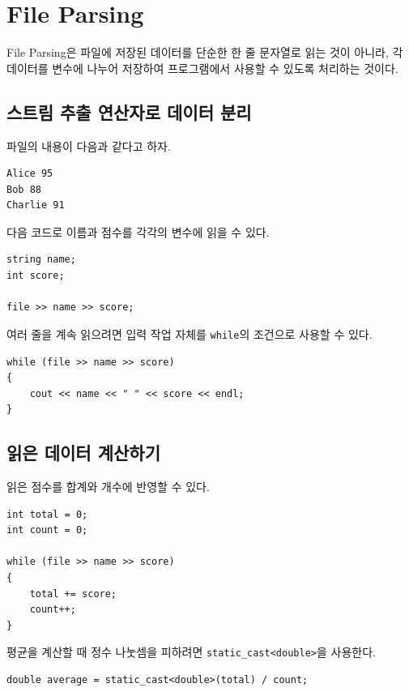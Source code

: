 \documentclass[11pt,a4paper]{article}
\begin{document}
\section{File Parsing}
File Parsing은 파일에 저장된 데이터를 단순한 한 줄 문자열로 읽는 것이 아니라,
각 데이터를 변수에 나누어 저장하여 프로그램에서 사용할 수 있도록 처리하는 것이다.

\subsection{스트림 추출 연산자로 데이터 분리}
파일의 내용이 다음과 같다고 하자.

\begin{verbatim}
Alice 95
Bob 88
Charlie 91
\end{verbatim}

다음 코드로 이름과 점수를 각각의 변수에 읽을 수 있다.

\begin{lstlisting}
string name;
int score;

file >> name >> score;
\end{lstlisting}

여러 줄을 계속 읽으려면 입력 작업 자체를 \texttt{while}의 조건으로 사용할 수 있다.

\begin{lstlisting}
while (file >> name >> score)
{
    cout << name << " " << score << endl;
}
\end{lstlisting}

\subsection{읽은 데이터 계산하기}
읽은 점수를 합계와 개수에 반영할 수 있다.

\begin{lstlisting}
int total = 0;
int count = 0;

while (file >> name >> score)
{
    total += score;
    count++;
}
\end{lstlisting}

평균을 계산할 때 정수 나눗셈을 피하려면 \texttt{static\_cast<double>}을 사용한다.

\begin{lstlisting}
double average = static_cast<double>(total) / count;
\end{lstlisting}
\end{document}
